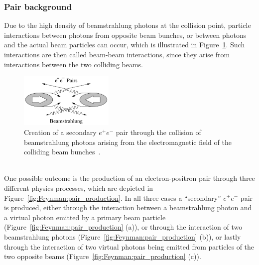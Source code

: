 \subsubsection{Pair background}
\label{BeamBeam:pairs}
Due to the high density of beamstrahlung photons at the collision point, particle interactions between photons from opposite beam bunches, or between photons and the actual beam particles can occur, which is illustrated in Figure~\ref{fig:Pair_production}.
Such interactions are then called beam-beam interactions, since they arise from interactions between the two colliding beams.
\begin{figure}
\centering
\includegraphics[width=0.4\textwidth]{Figures/PairBackground.png}
\caption{Creation of a secondary $e^+e^-$ pair through the collision of beamstrahlung photons arising from the electromagnetic field of the colliding beam bunches~\cite[]{Vogel}.}
\label{fig:Pair_production} 
\end{figure}
\\One possible outcome is the production of an electron-positron pair through three different physics processes, which are depicted in Figure~\ref{fig:Feynman:pair_production}.
In all three cases a ``secondary'' $e^+e^-$ pair is produced, either through the interaction between a beamstrahlung photon and a virtual photon emitted by a primary beam particle (Figure~\ref{fig:Feynman:pair_production} (a)),
or through the interaction of two beamstrahlung photons (Figure~\ref{fig:Feynman:pair_production} (b)),
or lastly through the interaction of two virtual photons being emitted from particles of the two opposite beams (Figure~\ref{fig:Feynman:pair_production} (c)).
